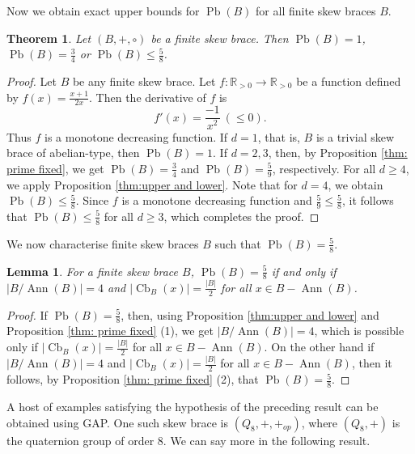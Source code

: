 \documentclass[oneside]{amsart}
\numberwithin{equation}{section}
\theoremstyle{plain}
\newtheorem{lemma}[equation]{Lemma}
\newtheorem{thm}[equation]{Theorem}
\theoremstyle{definition}
\newcommand{\Cb}{\operatorname{Cb} }
\newcommand{\Pb}{\operatorname{Pb} }
\newcommand{\Ann}{\operatorname{Ann} }
\begin{document}
Now we obtain exact upper bounds for $\Pb(B)$ for all finite skew braces  $B$.
\begin{thm}  \label{thm: (5/8,1)}
 Let $(B,+, \circ)$ be a finite skew brace. Then $\Pb(B) = 1$,  $\Pb(B) = \frac{3}{4}$ or $\Pb(B) \leqslant \frac{5}{8}$.
\end{thm}
\begin{proof}
Let  $B$ be any finite skew brace. Let $f:\mathbb{R}_{> 0}\rightarrow \mathbb{R}_{> 0}$ be a function defined by $f(x)=\frac{x+1}{2x}$. Then the derivative of $f$ is 
$$f'(x)= \frac{-1}{x^2} ~ (\leqslant 0).$$
Thus $f$ is a monotone decreasing function.  If $d=1$, that is, $B$ is a trivial skew brace of abelian-type, then $\Pb(B) = 1$. If $d = 2, 3$, then, by Proposition \ref{thm: prime fixed}, we get $\Pb(B)=\frac{3}{4}$ and  $\Pb(B)=\frac{5}{9}$, respectively. For all $d \geqslant 4$, we apply Proposition \ref{thm:upper and lower}. Note that for $d=4$, we obtain $\Pb(B)\leqslant \frac{5}{8}$.  Since $f$ is a monotone decreasing function  and $\frac{5}{9}\leqslant \frac{5}{8}$, it follows that $\Pb(B) \leqslant \frac{5}{8}$ for all $d \geqslant 3$, which completes the proof.    
\end{proof}

We now characterise finite skew braces $B$ such that $\Pb(B) = \frac{5}{8}$.

\begin{lemma}
For a finite skew brace $B$, $\Pb(B) = \frac{5}{8}$ if and only if $|B/\Ann(B)|= 4$ and $|\Cb_B(x)| = \frac{|B|}{2}$ for all $x \in B -\Ann(B)$.
\end{lemma}
\begin{proof}
If $\Pb(B) = \frac{5}{8}$, then, using  Proposition \ref{thm:upper and lower} and Proposition \ref{thm:  prime fixed} (1),  we get $|B/\Ann(B)|= 4$, which is possible only if  $|\Cb_B(x)| = \frac{|B|}{2}$ for all $x \in B -\Ann(B)$. On the other hand if $|B/\Ann(B)|= 4$ and $|\Cb_B(x)| = \frac{|B|}{2}$ for all $x \in B -\Ann(B)$, then it follows, by Proposition \ref{thm:  prime fixed} (2), that $\Pb(B) = \frac{5}{8}$.
\end{proof}
A host of examples satisfying the hypothesis of the preceding result  can be obtained using GAP.  One such skew brace is $(Q_8, +, +_{op})$, where $(Q_8, +)$ is the quaternion group of order 8. We can say more in the following result.
\end{document}
